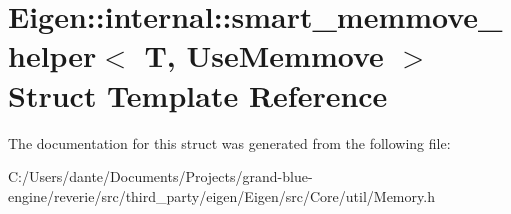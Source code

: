 \hypertarget{struct_eigen_1_1internal_1_1smart__memmove__helper}{}\section{Eigen\+::internal\+::smart\+\_\+memmove\+\_\+helper$<$ T, Use\+Memmove $>$ Struct Template Reference}
\label{struct_eigen_1_1internal_1_1smart__memmove__helper}


The documentation for this struct was generated from the following file\+:\begin{DoxyCompactItemize}
\item 
C\+:/\+Users/dante/\+Documents/\+Projects/grand-\/blue-\/engine/reverie/src/third\+\_\+party/eigen/\+Eigen/src/\+Core/util/Memory.\+h\end{DoxyCompactItemize}
